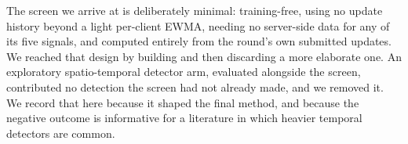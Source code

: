 \documentclass[journal]{IEEEtran}
\begin{document}
The screen we arrive at is deliberately minimal: training-free, using no update history beyond a light per-client EWMA, needing no server-side data for any of its five signals, and computed entirely from the round's own submitted updates. We reached that design by building and then discarding a more elaborate one. An exploratory spatio-temporal detector arm, evaluated alongside the screen, contributed no detection the screen had not already made, and we removed it. We record that here because it shaped the final method, and because the negative outcome is informative for a literature in which heavier temporal detectors are common.




\end{document}
